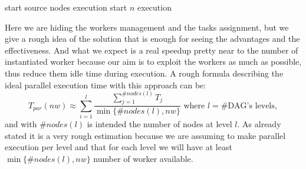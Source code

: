 \documentclass[a4paper,11pt]{article}
\begin{document}
\begin{algorithm}
\begin{algorithmic}
\State start source nodes execution
\State start $ n $ execution
\EndFor
\end{algorithmic}
\end{algorithm}
Here we are hiding the workers management and the tasks assignment, but we give a rough idea of the solution that is enough for seeing the advantages and the effectiveness.
And what we expect is a real speedup pretty near to the number of instantiated worker because our aim is to exploit the workers as much as possible, thus reduce them idle time during execution.
A rough formula describing the ideal parallel execution time with this approach can be:
\begin{equation}
	T_{par}(nw) \approx \sum_{i=1}^{l} \frac{\sum_{j=1}^{\#nodes(l)} T_j}{\min\{\#nodes(l), nw\}} \text{ where } l = \#\text{DAG's levels},
\end{equation}
and with $\#nodes(l)$ is intended the number of nodes at level $l$. 
As already stated it is a very rough estimation because we are assuming to make parallel execution per level and that for each level we will have at least $ \min\{\#nodes(l), nw\} $ number of worker available.
\end{document}
